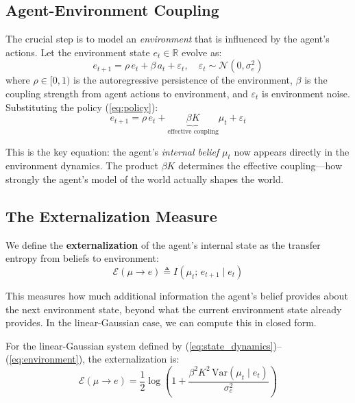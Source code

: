 \documentclass[runningheads]{llncs}
\begin{document}
\subsection{Agent-Environment Coupling}

The crucial step is to model an \emph{environment} that is influenced by the agent's actions. Let the environment state $e_t \in \mathbb{R}$ evolve as:
\begin{equation}
    e_{t+1} = \rho \, e_t + \beta \, a_t + \varepsilon_t, \quad \varepsilon_t \sim \mathcal{N}(0, \sigma_e^2)
    \label{eq:environment}
\end{equation}
where $\rho \in [0,1)$ is the autoregressive persistence of the environment, $\beta$ is the coupling strength from agent actions to environment, and $\varepsilon_t$ is environment noise. Substituting the policy (\ref{eq:policy}):
\begin{equation}
    e_{t+1} = \rho \, e_t + \underbrace{\beta K}_{\text{effective coupling}} \mu_t + \varepsilon_t
    \label{eq:env_with_beliefs}
\end{equation}

This is the key equation: the agent's \emph{internal belief} $\mu_t$ now appears directly in the environment dynamics. The product $\beta K$ determines the effective coupling---how strongly the agent's model of the world actually shapes the world.

\subsection{The Externalization Measure}

We define the \textbf{externalization} of the agent's internal state as the transfer entropy from beliefs to environment:
\begin{equation}
    \mathcal{E}(\mu \to e) \triangleq I(\mu_t; \, e_{t+1} \mid e_t)
    \label{eq:externalization}
\end{equation}

This measures how much additional information the agent's belief provides about the next environment state, beyond what the current environment state already provides. In the linear-Gaussian case, we can compute this in closed form.

\begin{proposition}
\label{prop:closed_form}
For the linear-Gaussian system defined by (\ref{eq:state_dynamics})--(\ref{eq:environment}), the externalization is:
\begin{equation}
    \mathcal{E}(\mu \to e) = \frac{1}{2} \log \left( 1 + \frac{\beta^2 K^2 \, \mathrm{Var}(\mu_t \mid e_t)}{\sigma_e^2} \right)
    \label{eq:externalization_closed}
\end{equation}
\end{proposition}
\end{document}
